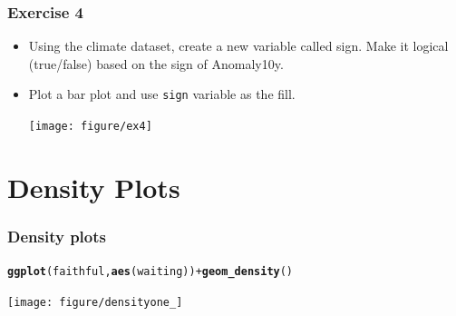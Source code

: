 \documentclass{beamer}\usepackage[]{graphicx}\usepackage[]{color}
\makeatletter
\newcommand{\hlkwd}[1]{\textcolor[rgb]{0.737,0.353,0.396}{\textbf{#1}}}%
\newenvironment{kframe}{%
 \def\at@end@of@kframe{}%
 \ifinner\ifhmode%
  \def\at@end@of@kframe{\end{minipage}}%
  \begin{minipage}{\columnwidth}%
 \fi\fi%
 \def\FrameCommand##1{\hskip\@totalleftmargin \hskip-\fboxsep
 \colorbox{shadecolor}{##1}\hskip-\fboxsep
     \hskip-\linewidth \hskip-\@totalleftmargin \hskip\columnwidth}%
 \MakeFramed {\advance\hsize-\width
   \@totalleftmargin\z@ \linewidth\hsize
   \@setminipage}}%
 {\par\unskip\endMakeFramed%
 \at@end@of@kframe}
\newenvironment{knitrout}{}{} %
\makeatother
\begin{document}

\begin{frame}[fragile]
\frametitle{Exercise 4}
\begin{itemize}
\item Using the climate dataset, create a new variable called sign. Make it logical (true/false) based on the sign of Anomaly10y.
\item Plot a bar plot and use \texttt{sign} variable as the fill.\\
\begin{knitrout}\footnotesize
{}\color{fgcolor}

{\centering \texttt{[image: figure/ex4]} 

}



\end{knitrout}


\end{itemize}
\end{frame}


\section*{Density Plots}
\frame{\sectionpage}


\begin{frame}[fragile]
\frametitle{Density plots}
\begin{knitrout}\footnotesize
{}\color{fgcolor}\begin{kframe}
\begin{alltt}
\hlkwd{ggplot}(faithful, \hlkwd{aes}(waiting)) + \hlkwd{geom_density}()
\end{alltt}
\end{kframe}

{\centering \texttt{[image: figure/densityone\_]} 

}



\end{knitrout}

\end{frame}
\end{document}
